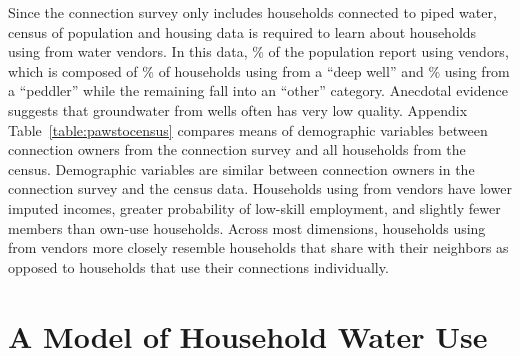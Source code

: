 \documentclass[12pt]{article}
\begin{document}
Since the connection survey only includes households connected to piped water, census of population and housing data is required to learn about households using from water vendors.  In this data, \unskip\% of the population report using vendors, which is composed of \unskip\% of households using from a ``deep well'' and \unskip\% using from a ``peddler'' while the remaining fall into an ``other'' category.  Anecdotal evidence suggests that groundwater from wells often has very low quality.  Appendix Table~\ref{table:pawstocensus} compares means of demographic variables between connection owners from the connection survey and all households from the census.  Demographic variables are similar between connection owners in the connection survey and the census data.  Households using from vendors have lower imputed incomes, greater probability of low-skill employment, and slightly fewer members than own-use households.  Across most dimensions, households using from vendors more closely resemble households that share with their neighbors as opposed to households that use their connections individually.











\section{A Model of Household Water Use}\label{section:modelofhouseholdwateruse}
\end{document}
